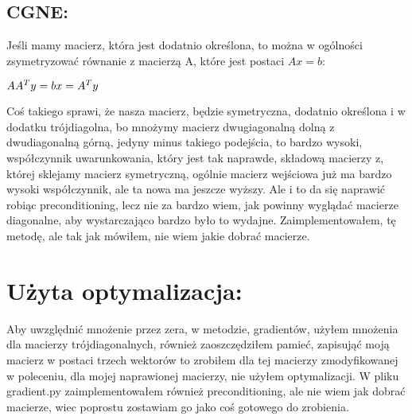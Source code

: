 \documentclass[12pt]{article}
\begin{document}
\subsection{CGNE: }
Jeśli mamy macierz, która jest dodatnio określona, to można w ogólności zsymetryzować równanie z macierzą A, które jest postaci $Ax=b$:
\begin{center}
$
AA^{T}y=b \newline
x=A^{T}y
$
\end{center}
Coś takiego sprawi, że nasza macierz, będzie symetryczna, dodatnio określona i w dodatku trójdiagolna, bo mnożymy macierz dwugiagonalną dolną z dwudiagonalną górną, jedyny minus takiego podejścia, to bardzo wysoki, współczynnik uwarunkowania, który jest tak naprawde, składową macierzy z, której sklejamy macierz symetryczną, ogólnie macierz wejściowa już ma bardzo wysoki współczynnik, ale ta nowa ma jeszcze wyższy. Ale i to da się naprawić robiąc preconditioning, lecz nie za bardzo wiem, jak powinny wyglądać macierze diagonalne, aby wystarczająco bardzo było to wydajne. Zaimplementowałem, tę metodę, ale tak jak mówiłem, nie wiem jakie dobrać macierze.
\section{Użyta optymalizacja:}
Aby uwzględnić mnożenie przez zera, w metodzie, gradientów, użyłem mnożenia dla macierzy trójdiagonalnych, również zaoszczędziłem pamieć, zapisująć moją macierz w postaci trzech wektorów to zrobiłem dla tej macierzy zmodyfikowanej w poleceniu, dla mojej naprawionej macierzy, nie użyłem optymalizacji. W pliku gradient.py zaimplementowałem również preconditioning, ale nie wiem jak dobrać macierze, wiec poprostu zostawiam go jako coś gotowego do zrobienia.
\end{document}
